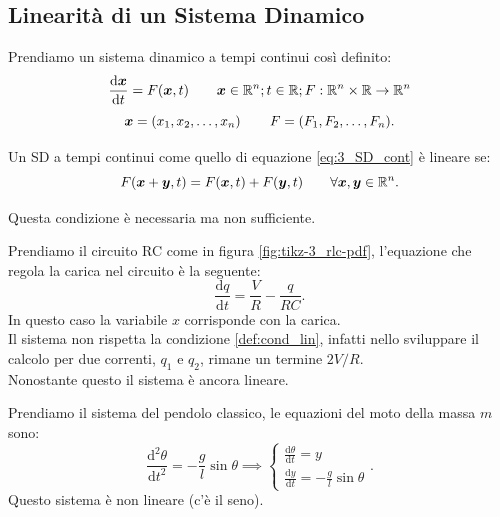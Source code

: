 \subsection{Linearità di un Sistema Dinamico}%
\label{sub:Linearità di un Sistema Dinamico}
Prendiamo un sistema dinamico a tempi continui così definito:
\begin{equation}
    \frac{\text{d} \boldsymbol{x}}{\text{d} t} = F(\boldsymbol{x}, t) \qquad \boldsymbol{x}  \in \mathbb{R}^n; t \in \mathbb{R}; F: \mathbb{R}^n\times \mathbb{R} \to \mathbb{R}^n
    \label{eq:3_SD_cont}
\end{equation}
\[
    \boldsymbol{x}  = \left(x_1, x_2, \ldots, x_n\right) \qquad F = (F_1, F_2, \ldots, F_n)
.\] 
\begin{defn}
    \label{def:cond_lin}
    Un SD a tempi continui come quello di equazione \ref{eq:3_SD_cont} è lineare se:
    \[
	F(\boldsymbol{x}  + \boldsymbol{y}, t) = F(\boldsymbol{x}, t) + F(\boldsymbol{y}, t) \qquad \forall \boldsymbol{x}, \boldsymbol{y}  \in \mathbb{R}^n
    .\] 
\end{defn}
\noindent
Questa condizione è necessaria ma non sufficiente.
\begin{exmp}[Circuito RC]
    Prendiamo il circuito RC come in figura \ref{fig:tikz-3_rlc-pdf}, l'equazione che regola la carica nel circuito è la seguente:
    \[
        \frac{\text{d} q}{\text{d} t} = \frac{V}{R}-\frac{q}{RC}
    .\] 
    In questo caso la variabile $x$ corrisponde con la carica.\\
    Il sistema non rispetta la condizione \ref{def:cond_lin}, infatti nello sviluppare il calcolo per due correnti, $q_1$ e $q_2$, rimane un termine $2V / R$. \\
    Nonostante questo il sistema è ancora lineare.
\end{exmp}
\noindent
\begin{exmp}[Pendolo]
    Prendiamo il sistema del pendolo classico, le equazioni del moto della massa $m$ sono:
    \[
	\frac{\text{d} ^2\theta}{\text{d} t^2} = -\frac{g}{l}\sin\theta \implies
        \begin{cases}
	    \frac{\text{d} \theta}{\text{d} t} = y\\
	    \frac{\text{d} y}{\text{d} t} = - \frac{g}{l}\sin\theta
        \end{cases}
    .\] 
    Questo sistema è non lineare (c'è il seno).
\end{exmp}
